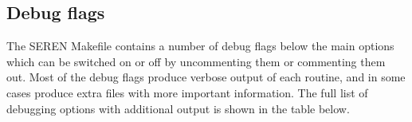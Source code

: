 \documentclass[a4paper]{article}
\begin{document}
\newpage


\subsection{Debug flags} \label{SS:PARAMS}
The SEREN Makefile contains a number of debug flags below the main options which can be switched on or off by uncommenting them or commenting them out.  Most of the debug flags produce verbose output of each routine, and in some cases produce extra files with more important information.  The full list of debugging options with additional output is shown in the table below.\newline

\tabletail{\hline}
\tablelasttail{\hline}
\end{document}

